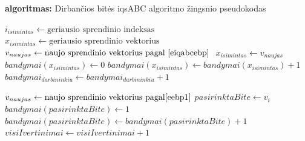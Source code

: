 \documentclass{VUMIFKompMagistrinis}
\begin{document}
\begin{algorithm}[H]
\caption{\textbf{algoritmas:} Dirbančios bitės iqsABC algoritmo žingsnio pseudokodas}
\begin{spacing}{1.0}
\begin{algorithmic}[1]
                \State $i_{isimintas} \gets \text{geriausio sprendinio indeksas} $
                \State $x_{isimintas} \gets  \text{geriausio sprendinio vektorius} $
                \State $v_{naujas} \gets \text{naujo sprendinio vektorius pagal \eqref{eiqabcebp} } $
                    \State $x_{isimintas} \gets v_{naujas}$
                    \State $bandymai(x_{isimintas}) \gets 0$
                \Else
                    \State $bandymai(x_{isimintas}) \gets bandymai(x_{isimintas})+1$
                    \State $bandymai_{darbininkiu} \gets bandymai_{darbininkiu}+1$
                \EndIf
                

            \Else      
                \State $v_{naujas} \gets \text{naujo sprendinio vektorius pagal} \eqref{eebp1}$
                    \State $pasirinktaBite \gets v_{i} $
                    \State $bandymai(pasirinktaBite) \gets 1$
                \Else
                    \State $bandymai(pasirinktaBite) \gets bandymai(pasirinktaBite)+1$
                \EndIf
            \EndIf
        \EndIf
        \State $visiIvertinimai \gets visiIvertinimai + 1$
    \EndFor
\end{algorithmic}
\end{spacing}
\label{alg:2}
\end{algorithm}
\end{document}
